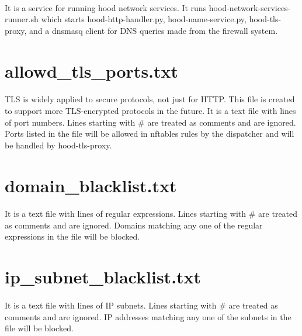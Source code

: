 \documentclass[mscthesis]{usiinfthesis}
\begin{document}
\paragraph{}
It is a service for running hood network services. It runs hood-network-services-runner.sh which starts hood-http-handler.py, hood-name-service.py, hood-tls-proxy, and a dnsmasq client for DNS queries made from the firewall system.

\section{allowd\_tls\_ports.txt}\label{sec:allowed_tls_ports.txt}
\paragraph{}
TLS is widely applied to secure protocols, not just for HTTP. This file is created to support more TLS-encrypted protocols in the future. It is a text file with lines of port numbers. Lines starting with \# are treated as comments and are ignored. Ports listed in the file will be allowed in nftables rules by the dispatcher and will be handled by hood-tls-proxy.

\section{domain\_blacklist.txt}\label{sec:domain_blacklist.txt}
\paragraph{}
It is a text file with lines of regular expressions. Lines starting with \# are treated as comments and are ignored. Domains matching any one of the regular expressions in the file will be blocked.

\section{ip\_subnet\_blacklist.txt}\label{sec:ip_subnet_blacklist.txt}
\paragraph{}
It is a text file with lines of IP subnets. Lines starting with \# are treated as comments and are ignored. IP addresses matching any one of the subnets in the file will be blocked.
\end{document}
